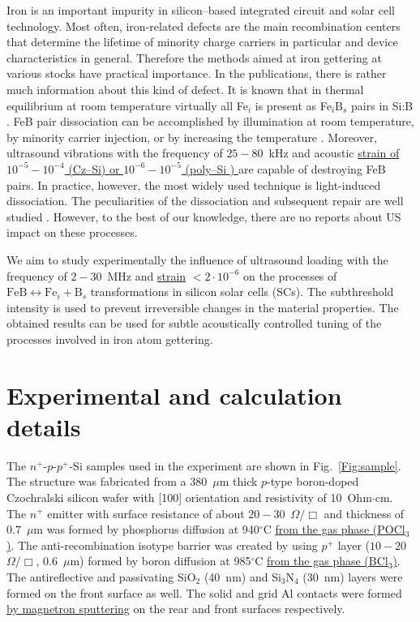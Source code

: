 \documentclass[%
 aip,jap,
 amsmath,amssymb,
 reprint,%
]{revtex4-1}
\begin{document}
Iron is an important impurity in silicon--based integrated circuit and solar cell technology.
Most often, iron-related defects are the main recombination centers that determine the lifetime of  minority charge carriers in particular and device characteristics in general.
Therefore the methods aimed at iron gettering at various stocks have practical importance.
In the publications, there is rather much information about this kind of defect.
It is known that in thermal equilibrium at room temperature virtually all Fe$_i$ is present as Fe$_i$B$_s$ pairs in Si:B \cite{FeBLight2,FeBJAP2005}.
FeB pair dissociation can be accomplished by illumination at room temperature, by minority carrier injection, or by increasing the temperature \cite{FeBLight2,FeBAssJAP2014,FeB_Zong}.
Moreover, ultrasound  vibrations with the frequency of $25-80$~kHz and acoustic
\textcolor[rgb]{0.00,0.07,1.00}{\uline{
strain of $10^{-5}-10^{-4}$ (Cz--Si\cite{Ostapenko1995})
or $10^{-6}-10^{-5}$ (poly--Si \cite{Ostapenko1995SST,Ostapenko1994APL})
}}
are capable of destroying FeB pairs.
In practice, however, the most widely used technique is light-induced dissociation.
The peculiarities of the dissociation and subsequent repair are well studied \cite{FeBLight2,FeBKin2019,FeBAssJAP2014,FeBJAP2005,FeBAssSST2011,lauer2016,FeBStrongIll,FeBkinAPL2008,FeBKinAPL2013}. However, to the best of our knowledge, there are no reports about US impact on these processes.

We aim  to study experimentally the influence of ultrasound loading with the
frequency of $2-30$~MHz and  \textcolor[rgb]{0.00,0.07,1.00}{\uline{strain}} $<2\cdot10^{-6}$ on the
processes of $\mathrm{FeB}\leftrightarrow\mathrm{Fe}_i+\mathrm{B}_s$ transformations in silicon solar cells (SCs).
The subthreshold intensity is used to prevent irreversible changes in the material properties.
The obtained results can be used for subtle acoustically controlled tuning of the processes involved in iron atom gettering.

\section{\label{sec:Exp}Experimental and calculation details}


The $n^+$-$p$-$p^+$-Si samples used in the experiment are shown in Fig.~\ref{Fig:sample}.
The structure was fabricated from a 380~$\mu$m thick $p$-type boron-doped
Czochralski silicon wafer with [100] orientation and resistivity of 10~Ohm$\cdot$cm.
The $n^+$ emitter with surface resistance of about $20-30$~$\Omega/\Box$
and  thickness of $0.7$~$\mu$m was formed by phosphorus diffusion at 940$^\circ$C
\textcolor[rgb]{0.00,0.07,1.00}{\uline{from the gas phase (POCl$_3$)}}.
The anti-recombination isotype barrier was created by using $p^+$
layer ($10-20$~$\Omega/\Box$, $0.6$~$\mu$m) formed by boron diffusion at 985$^\circ$C
\textcolor[rgb]{0.00,0.07,1.00}{\uline{from the gas phase (BCl$_3$)}}.
The antireflective and passivating SiO$_2$ (40~nm) and Si$_3$N$_4$ (30~nm) layers
were formed on the front surface as well.
The solid and grid Al contacts were formed
\textcolor[rgb]{0.00,0.07,1.00}{\uline{by magnetron sputtering}}
on the rear and front surfaces respectively.
\end{document}
